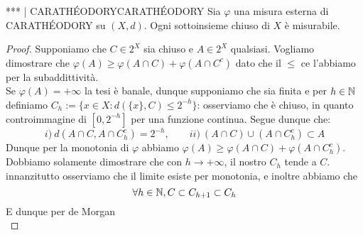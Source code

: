 \begin{theorem}{*** | CARATHÉODORY}{CARATHÉODORY}
    Sia $\varphi$ una misura esterna di CARATHÉODORY su $(X,d)$. Ogni sottoinsieme chiuso di $X$ è misurabile.
    \begin{proof}
        Supponiamo che $C\in 2^X$ sia chiuso e $A \in 2^X$ qualsiasi. Vogliamo dimostrare che $\varphi(A)\ge \varphi(A\cap C) + \varphi(A \cap C^c)$ dato che il $\le$ ce l'abbiamo per la subaddittività.\\
        Se $\varphi(A) = +\infty$ la tesi è banale, dunque supponiamo che sia finita e per $h \in \mathbb{N}$ definiamo $C_h := \{x \in X : d(\{x\},C) \le 2^{-h}\}$: osserviamo che è chiuso, in quanto controimmagine di $[0,2^{-h}]$ per una funzione continua. Segue dunque che:
        \[i)\: d(A\cap C , A\cap C_h^c) = 2^{-h}, \qquad ii)\: (A\cap C)\cup(A\cap C_h^c) \subset A\]
        Dunque per la monotonia di $\varphi$ abbiamo $\varphi(A)\ge \varphi(A\cap C) + \varphi(A\cap C_h^c)$. Dobbiamo solamente dimostrare che con $h \to +\infty$, il nostro $C_h$ tende a $C$. innanzitutto osserviamo che il limite esiste per monotonia, e inoltre abbiamo che 
        \[\forall h \in \mathbb{N}, C \subset C_{h+1} \subset C_h\]
        E dunque per de Morgan
        \[ \]
    \end{proof}
\end{theorem}
